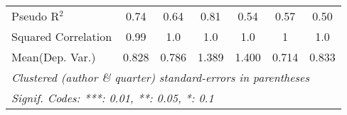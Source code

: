 \begin{tabular}{lcccccc}
   Pseudo R$^2$                                               & 0.74        & 0.64         & 0.81          & 0.54    & 0.57         & 0.50\\  
   Squared Correlation                                        & 0.99        & 1.0          & 1.0           & 1.0     & 1            & 1.0\\  
Mean(Dep. Var.) & 0.828 & 0.786 & 1.389 & 1.400 & 0.714 & 0.833 \\
   \midrule \midrule
   \multicolumn{7}{l}{\emph{Clustered (author \& quarter) standard-errors in parentheses}}\\
   \multicolumn{7}{l}{\emph{Signif. Codes: ***: 0.01, **: 0.05, *: 0.1}}\\
\end{tabular}
\par\endgroup

